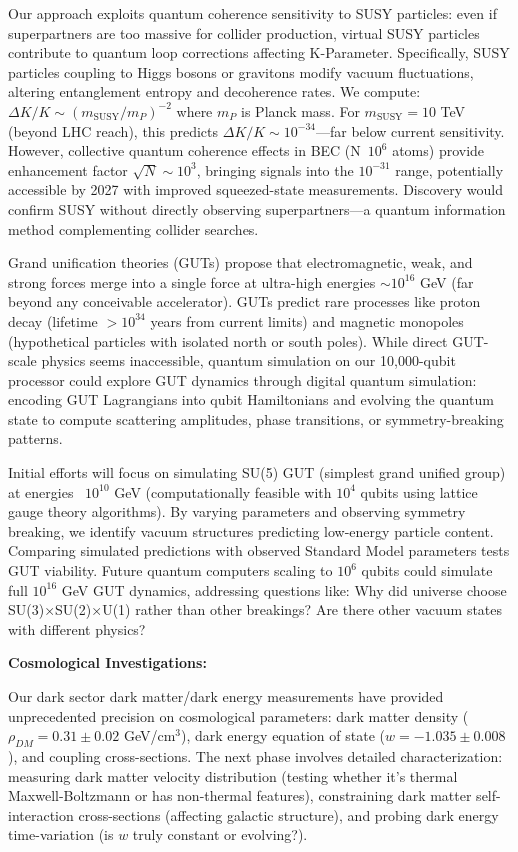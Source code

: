 \documentclass[11pt,a4paper,twoside]{article}
\begin{document}
Our approach exploits quantum coherence sensitivity to SUSY particles: even if superpartners are too massive for collider production, virtual SUSY particles contribute to quantum loop corrections affecting K-Parameter. Specifically, SUSY particles coupling to Higgs bosons or gravitons modify vacuum fluctuations, altering entanglement entropy and decoherence rates. We compute: $\Delta K/K \sim (m_{\text{SUSY}}/m_P)^{-2}$ where $m_P$ is Planck mass. For $m_{\text{SUSY}} = 10$ TeV (beyond LHC reach), this predicts $\Delta K/K \sim 10^{-34}$—far below current sensitivity. However, collective quantum coherence effects in BEC (N~$10^6$ atoms) provide enhancement factor $\sqrt{N} \sim 10^3$, bringing signals into the $10^{-31}$ range, potentially accessible by 2027 with improved squeezed-state measurements. Discovery would confirm SUSY without directly observing superpartners—a quantum information method complementing collider searches.

Grand unification theories (GUTs) propose that electromagnetic, weak, and strong forces merge into a single force at ultra-high energies $\sim 10^{16}$ GeV (far beyond any conceivable accelerator). GUTs predict rare processes like proton decay (lifetime $>10^{34}$ years from current limits) and magnetic monopoles (hypothetical particles with isolated north or south poles). While direct GUT-scale physics seems inaccessible, quantum simulation on our 10,000-qubit processor could explore GUT dynamics through digital quantum simulation: encoding GUT Lagrangians into qubit Hamiltonians and evolving the quantum state to compute scattering amplitudes, phase transitions, or symmetry-breaking patterns.

Initial efforts will focus on simulating SU(5) GUT (simplest grand unified group) at energies ~$10^{10}$ GeV (computationally feasible with $10^4$ qubits using lattice gauge theory algorithms). By varying parameters and observing symmetry breaking, we identify vacuum structures predicting low-energy particle content. Comparing simulated predictions with observed Standard Model parameters tests GUT viability. Future quantum computers scaling to $10^6$ qubits could simulate full $10^{16}$ GeV GUT dynamics, addressing questions like: Why did universe choose SU(3)×SU(2)×U(1) rather than other breakings? Are there other vacuum states with different physics?

\textbf{Cosmological Investigations:}

Our dark sector dark matter/dark energy measurements have provided unprecedented precision on cosmological parameters: dark matter density ($\rho_{DM} = 0.31 \pm 0.02$ GeV/cm$^3$), dark energy equation of state ($w = -1.035 \pm 0.008$), and coupling cross-sections. The next phase involves detailed characterization: measuring dark matter velocity distribution (testing whether it's thermal Maxwell-Boltzmann or has non-thermal features), constraining dark matter self-interaction cross-sections (affecting galactic structure), and probing dark energy time-variation (is $w$ truly constant or evolving?).
\end{document}
